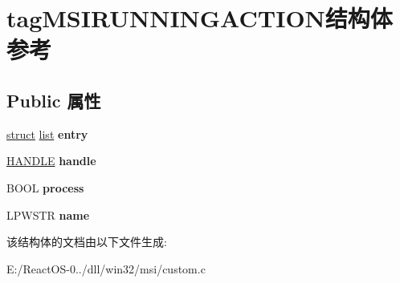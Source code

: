 \hypertarget{structtag_m_s_i_r_u_n_n_i_n_g_a_c_t_i_o_n}{}\section{tag\+M\+S\+I\+R\+U\+N\+N\+I\+N\+G\+A\+C\+T\+I\+O\+N结构体 参考}
\label{structtag_m_s_i_r_u_n_n_i_n_g_a_c_t_i_o_n}
\subsection*{Public 属性}
\begin{DoxyCompactItemize}
\item 
\mbox{\label{structtag_m_s_i_r_u_n_n_i_n_g_a_c_t_i_o_n_aee3f11c39c78efad382b58368809d056}} 
\hyperlink{interfacestruct}{struct} \hyperlink{classlist}{list} {\bfseries entry}
\item 
\mbox{\label{structtag_m_s_i_r_u_n_n_i_n_g_a_c_t_i_o_n_aadb6d3c98e9378b57ecdefa8c4d3ef9a}} 
\hyperlink{interfacevoid}{H\+A\+N\+D\+LE} {\bfseries handle}
\item 
\mbox{\label{structtag_m_s_i_r_u_n_n_i_n_g_a_c_t_i_o_n_aa653730f4441940c0b290f2484dcc758}} 
B\+O\+OL {\bfseries process}
\item 
\mbox{\label{structtag_m_s_i_r_u_n_n_i_n_g_a_c_t_i_o_n_a9774a88fe10e81fca2e88a0cde13b067}} 
L\+P\+W\+S\+TR {\bfseries name}
\end{DoxyCompactItemize}


该结构体的文档由以下文件生成\+:\begin{DoxyCompactItemize}
\item 
E\+:/\+React\+O\+S-\/0../dll/win32/msi/custom.\+c\end{DoxyCompactItemize}
